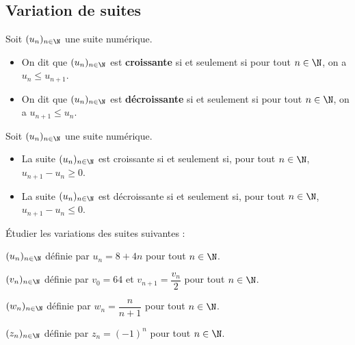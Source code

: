 \documentclass{article}
\begin{document}
\subsection{Variation de suites}
\begin{tcolorbox}
\begin{definition}
Soit $(u_n)_{n \in \N}$ une suite numérique.
\begin{itemize}
\item On dit que $(u_n)_{n \in \N}$ est \textbf{croissante} si et seulement si pour tout $n \in \N$, on a $u_n \leq u_{n+1}$. 
\item On dit que $(u_n)_{n \in \N}$ est \textbf{décroissante} si et seulement si pour tout $n \in \N$, on a $u_{n+1} \leq u_n$. 
\end{itemize}
\end{definition}
\end{tcolorbox}
\begin{proposition}
Soit $(u_n)_{n \in \N}$ une suite numérique.
\begin{itemize}
\item La suite $(u_n)_{n \in \N}$ est croissante si et seulement si, pour tout $n \in \N$, $u_{n+1} - u_n \geq 0$. 
\item La suite $(u_n)_{n \in \N}$ est décroissante si et seulement si, pour tout $n \in \N$, $u_{n+1} - u_n \leq 0$. 
\end{itemize}
\end{proposition}
\begin{example}
Étudier les variations des suites suivantes :
\begin{enumquestions}
\item $(u_n)_{n \in \N}$ définie par $u_n = 8 + 4n$ pour tout $n \in \N$.
\item $(v_n)_{n \in \N}$ définie par $v_0 = 64$ et $v_{n+1} = \dfrac{v_n}{2}$ pour tout $n \in \N$.
\item $(w_n)_{n \in \N}$ définie par $w_n = \dfrac{n}{n+1}$ pour tout $n \in \N$.
\item $(z_n)_{n \in \N}$ définie par $z_n = (-1)^n$ pour tout $n \in \N$.
\end{enumquestions}
\emptybox{6cm}
\end{example}
\newpage
\end{document}
